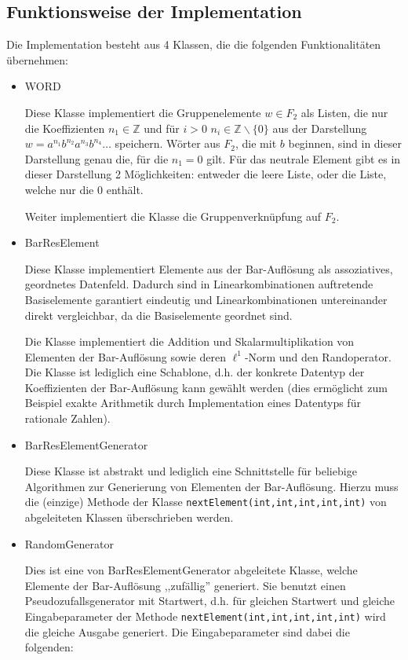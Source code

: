 \documentclass[a4paper,twoside,10pt]{scrreprt}
\newcommand{\Z}{\mathbb{Z}}
\theoremstyle{definition}
\begin{document}
\subsection*{Funktionsweise der Implementation}
Die Implementation besteht aus 4 Klassen, die die folgenden Funktionalitäten übernehmen:
\begin{itemize}
\item WORD\par
Diese Klasse implementiert die Gruppenelemente $w\in F_2$ als Listen, die nur die Koeffizienten $n_1\in \Z$ und für $i>0$ $n_i\in \Z\backslash\{0\}$ aus der Darstellung $w=a^{n_1}b^{n_2}a^{n_3}b^{n_4}\ldots$ speichern. Wörter aus $F_2$, die mit $b$ beginnen, sind in dieser Darstellung genau die, für die $n_1=0$ gilt. Für das neutrale Element gibt es in dieser Darstellung 2 Möglichkeiten: entweder die leere Liste, oder die Liste, welche nur die $0$ enthält.\par
Weiter implementiert die Klasse die Gruppenverknüpfung auf $F_2$.
\item BarResElement\par
Diese Klasse implementiert Elemente aus der Bar-Auflösung als assoziatives, geordnetes Datenfeld. Dadurch sind in Linearkombinationen auftretende Basiselemente garantiert eindeutig und Linearkombinationen untereinander direkt vergleichbar, da die Basiselemente geordnet sind.\par
Die Klasse implementiert die Addition und Skalarmultiplikation von Elementen der Bar-Auflösung sowie deren $\ell^1$-Norm und den Randoperator. Die Klasse ist lediglich eine Schablone, d.h. der konkrete Datentyp der Koeffizienten der Bar-Auflösung kann gewählt werden (dies ermöglicht zum Beispiel exakte Arithmetik durch Implementation eines Datentyps für rationale Zahlen).
\item BarResElementGenerator\par
Diese Klasse ist abstrakt und lediglich eine Schnittstelle für beliebige Algorithmen zur Generierung von Elementen der Bar-Auflösung. Hierzu muss die (einzige) Methode der Klasse \lstinline|nextElement(int,int,int,int,int)| von abgeleiteten Klassen überschrieben werden.
\item RandomGenerator\par
Dies ist eine von BarResElementGenerator abgeleitete Klasse, welche Elemente der Bar-Auflösung ,,zufällig'' generiert. Sie benutzt einen Pseudozufallsgenerator mit Startwert, d.h. für gleichen Startwert und gleiche Eingabeparameter der Methode \lstinline|nextElement(int,int,int,int,int)| wird die gleiche Ausgabe generiert. Die Eingabeparameter sind dabei die folgenden:

\end{itemize}
\end{document}
